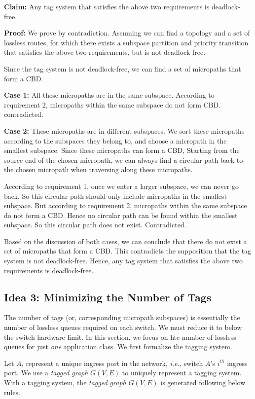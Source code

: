 

\textbf{Claim:} Any tag system that satisfies the above two requirements is deadlock-free.

\textbf{Proof:} We prove by contradiction. Assuming we can find a topology and a set of lossless routes, for which there exists a subspace partition and priority transition that satisfies the above two requirements, but is not deadlock-free.

Since the tag system is not deadlock-free, we can find a set of micropaths that form a CBD. 

\textbf{Case 1:} All these micropaths are in the same subspace. According to requirement 2, micropaths within the same subspace do not form CBD. contradicted.

\textbf{Case 2:} These micropaths are in different subspaces. We sort these micropaths according to the subspaces they belong to, and choose a micropath in the smallest subspace. Since these micropaths can form a CBD,  Starting from the source end of the chosen micropath, we can always find a circular path back to the chosen micropath when traversing along these micropaths. 
 
 According to requirement 1, once we enter a larger subspace, we can never go back. So this circular path should only include micropaths in the smallest subspace. But according to requirement 2, micropaths within the same subspace do not form a CBD. Hence no circular path can be found within the smallest subspace. So this circular path does not exist. Contradicted.
 
Based on the discussion of both cases, we can conclude that there do not exist a set of micropaths that form a CBD. This contradicts the supposition that the tag system is not deadlock-free. Hence, any tag system that satisfies the above two requirements is deadlock-free.


\subsection{Idea 3: Minimizing the Number of Tags} 
The number of tags (or, corresponding micropath subspaces) is essentially the number of lossless queues required on each switch.
We must reduce it to below the switch hardware limit. In this section, we focus on hte number of lossless queues for 
just {\em one} application class. We first formalize the tagging system.

 Let $A_i$ represent a unique ingress port in the network, {\em i.e.,} switch $A$'s $i^{th}$ ingress port.
We use a {\em tagged graph} $G(V,E)$ to uniquely represent a tagging system.
With a tagging system, the {\em tagged graph} $G(V,E)$ is generated following below rules.

